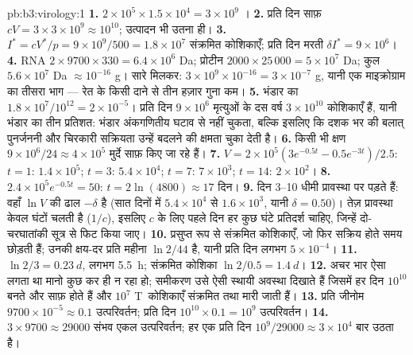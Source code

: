 \begin{solution}{pb:b3:virology:1}
\textbf{1.} $2\times 10^{5}\times 1.5\times 10^{4} = 3\times 10^{9}$
।
\textbf{2.} प्रति दिन साफ़ $cV = 3\times 3\times 10^{9} \approx 10^{10}$;
उत्पादन भी उतना ही।
\textbf{3.} $I^{*} = cV^{*}/p = 9\times 10^{9}/500 = 1.8\times 10^{7}$
संक्रमित कोशिकाएँ; प्रति दिन मरती $\delta I^{*} = 9\times 10^{6}$।
\textbf{4.} RNA $2\times 9700\times 330 = 6.4\times 10^{6}$ Da; प्रोटीन
$2000\times 25\,000 = 5\times 10^{7}$ Da; कुल $5.6\times 10^{7}$ Da
$\approx 10^{-16}$ g। सारे  मिलकर: $3\times 10^{9}\times
10^{-16} = 3\times 10^{-7}$ g, यानी एक माइक्रोग्राम का तीसरा भाग ---
रेत के किसी दाने से तीन हज़ार गुना कम।
\textbf{5.} भंडार का $1.8\times 10^{7}/10^{12} = 2\times 10^{-5}$।
प्रति दिन $9\times 10^{6}$ मृत्युओं के दस वर्ष $3\times 10^{10}$
कोशिकाएँ हैं, यानी भंडार का तीन प्रतिशत: भंडार अंकगणितीय घटाव से नहीं
चुकता, बल्कि इसलिए कि दशक भर की बलात् पुनर्जननी और चिरकारी सक्रियता
उन्हें बदलने की क्षमता चुका देती है।
\textbf{6.} किसी भी क्षण $9\times 10^{6}/24 \approx 4\times 10^{5}$
मुर्दे साफ़ किए जा रहे हैं।
\textbf{7.} $V = 2\times 10^{5}(3e^{-0.5t} - 0.5e^{-3t})/2.5$: $t = 1$:
$1.4\times 10^{5}$; $t = 3$: $5.4\times 10^{4}$; $t = 7$: $7\times
10^{3}$; $t = 14$: $2\times 10^{2}$।
\textbf{8.} $2.4\times 10^{5}e^{-0.5t} = 50$: $t = 2\ln(4800) \approx 17$
दिन।
\textbf{9.} दिन 3--10 धीमी प्रावस्था पर पड़ते हैं: वहाँ $\ln V$ की ढाल
$-\delta$ है (सात दिनों में $5.4\times 10^{4}$ से $1.6\times 10^{3}$,
यानी $\delta = 0.50$)। तेज़ प्रावस्था केवल घंटों चलती है ($1/c$), इसलिए
$c$ के लिए पहले दिन हर कुछ घंटे प्रतिदर्श चाहिए, जिन्हें दो-चरघातांकी
सूत्र से फिट किया जाए।
\textbf{10.} प्रसुप्त रूप से संक्रमित कोशिकाएँ, जो फिर सक्रिय होते समय
 छोड़ती हैं; उनकी क्षय-दर प्रति महीना $\ln 2/44$ है, यानी प्रति
दिन लगभग $5\times 10^{-4}$।
\textbf{11.}  $\ln 2/3 = \qty{0.23}{d}$, लगभग \qty{5.5}{h};
संक्रमित कोशिका $\ln 2/0.5 = \qty{1.4}{d}$।
\textbf{12.} अचर भार ऐसा लगता था मानो  कुछ कर ही न रहा हो;
समीकरण उसे ऐसी स्थायी अवस्था दिखाते हैं जिसमें हर दिन $10^{10}$
 बनते और साफ़ होते हैं और $10^{7}$ T~कोशिकाएँ संक्रमित तथा मारी
जाती हैं।
\textbf{13.} प्रति जीनोम $9700\times 10^{-5} \approx 0.1$ उत्परिवर्तन;
प्रति दिन $10^{10}\times 0.1 = 10^{9}$ उत्परिवर्तन।
\textbf{14.} $3\times 9700 \approx \num{29000}$ संभव एकल उत्परिवर्तन;
हर एक प्रति दिन $10^{9}/\num{29000} \approx 3\times 10^{4}$ बार उठता है।

\end{solution}
